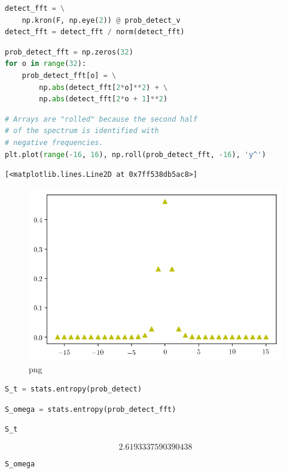 \begin{lstlisting}[language=Python]
detect_fft = \
    np.kron(F, np.eye(2)) @ prob_detect_v
detect_fft = detect_fft / norm(detect_fft)
\end{lstlisting}

\begin{lstlisting}[language=Python]
prob_detect_fft = np.zeros(32)
for o in range(32):
    prob_detect_fft[o] = \
        np.abs(detect_fft[2*o]**2) + \
        np.abs(detect_fft[2*o + 1]**2) 
\end{lstlisting}

\begin{lstlisting}[language=Python]
# Arrays are "rolled" because the second half 
# of the spectrum is identified with
# negative frequencies.
plt.plot(range(-16, 16), np.roll(prob_detect_fft, -16), 'y^')
\end{lstlisting}

\begin{lstlisting}
[<matplotlib.lines.Line2D at 0x7ff538db5ac8>]
\end{lstlisting}

\begin{figure}
\centering
\includegraphics[width=0.6\linewidth]{output_102_1.png}
\caption[]{png}
\end{figure}

\begin{lstlisting}[language=Python]
S_t = stats.entropy(prob_detect)
\end{lstlisting}

\begin{lstlisting}[language=Python]
S_omega = stats.entropy(prob_detect_fft)
\end{lstlisting}

\begin{lstlisting}[language=Python]
S_t
\end{lstlisting}

\[2.6193337590390438\]

\begin{lstlisting}[language=Python]
S_omega
\end{lstlisting}

